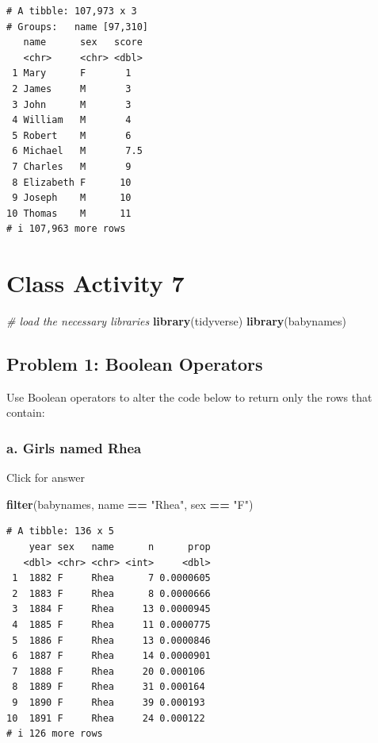 \documentclass[
]{book}
\newenvironment{Shaded}{\begin{snugshade}}{\end{snugshade}}
\newcommand{\CommentTok}[1]{\textcolor[rgb]{0.56,0.35,0.01}{\textit{#1}}}
\newcommand{\FunctionTok}[1]{\textcolor[rgb]{0.13,0.29,0.53}{\textbf{#1}}}
\newcommand{\NormalTok}[1]{#1}
\newcommand{\SpecialCharTok}[1]{\textcolor[rgb]{0.81,0.36,0.00}{\textbf{#1}}}
\newcommand{\StringTok}[1]{\textcolor[rgb]{0.31,0.60,0.02}{#1}}
\begin{document}
\begin{verbatim}
# A tibble: 107,973 x 3
# Groups:   name [97,310]
   name      sex   score
   <chr>     <chr> <dbl>
 1 Mary      F       1  
 2 James     M       3  
 3 John      M       3  
 4 William   M       4  
 5 Robert    M       6  
 6 Michael   M       7.5
 7 Charles   M       9  
 8 Elizabeth F      10  
 9 Joseph    M      10  
10 Thomas    M      11  
# i 107,963 more rows
\end{verbatim}

\hypertarget{class-activity-7}{%
\chapter{Class Activity 7}\label{class-activity-7}}

\begin{Shaded}
\begin{Highlighting}[]
\CommentTok{\# load the necessary libraries}
\FunctionTok{library}\NormalTok{(tidyverse)}
\FunctionTok{library}\NormalTok{(babynames)}
\end{Highlighting}
\end{Shaded}

\hypertarget{problem-1-boolean-operators}{%
\section{Problem 1: Boolean Operators}\label{problem-1-boolean-operators}}

Use Boolean operators to alter the code below to return only the rows that contain:

\hypertarget{a.-girls-named-rhea}{%
\subsection{a. Girls named Rhea}\label{a.-girls-named-rhea}}

Click for answer

\begin{Shaded}
\begin{Highlighting}[]
\FunctionTok{filter}\NormalTok{(babynames, name }\SpecialCharTok{==} \StringTok{"Rhea"}\NormalTok{, sex }\SpecialCharTok{==} \StringTok{"F"}\NormalTok{)}
\end{Highlighting}
\end{Shaded}

\begin{verbatim}
# A tibble: 136 x 5
    year sex   name      n      prop
   <dbl> <chr> <chr> <int>     <dbl>
 1  1882 F     Rhea      7 0.0000605
 2  1883 F     Rhea      8 0.0000666
 3  1884 F     Rhea     13 0.0000945
 4  1885 F     Rhea     11 0.0000775
 5  1886 F     Rhea     13 0.0000846
 6  1887 F     Rhea     14 0.0000901
 7  1888 F     Rhea     20 0.000106 
 8  1889 F     Rhea     31 0.000164 
 9  1890 F     Rhea     39 0.000193 
10  1891 F     Rhea     24 0.000122 
# i 126 more rows
\end{verbatim}
\end{document}
